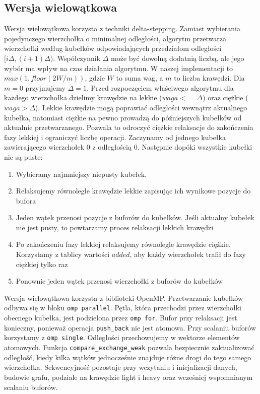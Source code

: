 \documentclass[12pt, a4paper]{article}
\begin{document}
\subsection{Wersja wielowątkowa}
Wersja wielowątkowa korzysta z techniki delta-stepping. Zamiast wybierania pojedynczego wierzchołka o minimalnej odległości, algorytm przetwarza wierzchołki według kubełków odpowiadających przedziałom odległości
$[i\Delta, (i+1)\Delta)$. Współczynnik $\Delta$  może być dowolną dodatnią liczbą, ale jego wybór ma wpływ na czas działania algorytmu. W naszej implementacji to $max(1, floor(2W/m))$, gdzie $W$ to suma wag, a $m$ to liczba krawędzi. Dla $m=0$ przyjmujemy $\Delta=1$. Przed rozpoczęciem właściwego algorytmu dla każdego wierzchołka dzielimy krawędzie na lekkie ($waga <= \Delta$) oraz ciężkie ($waga > \Delta$). Lekkie krawędzie mogą poprawiać odległości
wewnątrz aktualnego kubełka, natomiast ciężkie na pewno prowadzą
do późniejszych kubełków od aktualnie przetwarzanego. Pozwala to odroczyć ciężkie relaksacje do zakończenia fazy lekkiej i ograniczyć liczbę operacji. Zaczynamy od jednego kubełka zawierającego wierzchołek $0$ z odległością $0$. Następnie dopóki wszystkie kubełki nie są puste:
\begin{enumerate}
    \item Wybieramy najmniejszy niepusty kubełek. 
    \item Relaksujemy równolegle krawędzie lekkie zapisując ich wynikowe pozycje do bufora
    \item Jeden wątek przenosi pozycje z buforów do kubełków. Jeśli aktualny kubełek nie jest pusty, to powtarzamy proces relaksacji lekkich krawędzi
    \item Po zakończeniu fazy lekkiej relaksujemy równolegle krawędzie ciężkie. Korzystamy z tablicy wartości $added$, aby każdy wierzchołek trafił do fazy ciężkiej tylko raz
    \item Ponownie jeden wątek przenosi wierzchołki z buforów do kubełków
\end{enumerate}
Wersja wielowątkowa korzysta z biblioteki OpenMP. Przetwarzanie kubełków odbywa się w bloku \texttt{omp parallel}. Pętla, która przechodzi przez wierzchołki obecnego kubełka, jest podzielona przez \texttt{omp for}. Bufor przy relaksacji jest konieczny, ponieważ operacja \texttt{push\_back} nie jest atomowa. Przy scalaniu buforów korzystamy z \texttt{omp single}. Odległości przechowujemy w wektorze elementów atomowych. Funkcja \texttt{compare\_exchange\_weak} pozwala bezpiecznie zaktualizować odległość, kiedy kilka wątków jednocześnie
znajduje różne drogi do tego samego wierzchołka. Sekwencyjność pozostaje przy wczytaniu i inicjalizacji danych, budowie grafu, podziale na krawędzie light i heavy oraz wcześniej wspomnianym scalaniu buforów. 
\end{document}
